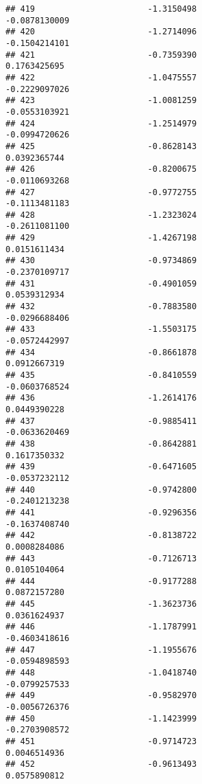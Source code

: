 \documentclass[
]{article}
\begin{document}
\begin{verbatim}
## 419                       -1.3150498                         -0.0878130009
## 420                       -1.2714096                         -0.1504214101
## 421                       -0.7359390                          0.1763425695
## 422                       -1.0475557                         -0.2229097026
## 423                       -1.0081259                         -0.0553103921
## 424                       -1.2514979                         -0.0994720626
## 425                       -0.8628143                          0.0392365744
## 426                       -0.8200675                         -0.0110693268
## 427                       -0.9772755                         -0.1113481183
## 428                       -1.2323024                         -0.2611081100
## 429                       -1.4267198                          0.0151611434
## 430                       -0.9734869                         -0.2370109717
## 431                       -0.4901059                          0.0539312934
## 432                       -0.7883580                         -0.0296688406
## 433                       -1.5503175                         -0.0572442997
## 434                       -0.8661878                          0.0912667319
## 435                       -0.8410559                         -0.0603768524
## 436                       -1.2614176                          0.0449390228
## 437                       -0.9885411                         -0.0633620469
## 438                       -0.8642881                          0.1617350332
## 439                       -0.6471605                         -0.0537232112
## 440                       -0.9742800                         -0.2401213238
## 441                       -0.9296356                         -0.1637408740
## 442                       -0.8138722                          0.0008284086
## 443                       -0.7126713                          0.0105104064
## 444                       -0.9177288                          0.0872157280
## 445                       -1.3623736                          0.0361624937
## 446                       -1.1787991                         -0.4603418616
## 447                       -1.1955676                         -0.0594898593
## 448                       -1.0418740                         -0.0799257533
## 449                       -0.9582970                         -0.0056726376
## 450                       -1.1423999                         -0.2703908572
## 451                       -0.9714723                          0.0046514936
## 452                       -0.9613493                          0.0575890812

\end{verbatim}
\end{document}
